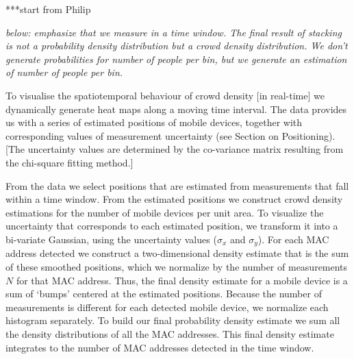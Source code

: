 \documentclass[10pt,a4paper]{article}
\begin{document}
***start from Philip

{\it below: emphasize that we measure in a time window. The final result of stacking is not a probability density distribution but a crowd density distribution. We don't generate probabilities for number of people per bin, but we generate an estimation of number of people per bin. }

To visualise the spatiotemporal behaviour of crowd density [in real-time] we dynamically generate heat maps along a moving time interval. 
The data provides us with a series of estimated positions of mobile devices, together with corresponding values of measurement uncertainty (see Section on Positioning).
[The uncertainty values are determined by the co-variance matrix resulting from the chi-square fitting method.]

From the data we select positions that are estimated from measurements that fall within a time window.
From the estimated positions we construct crowd density estimations for the number of mobile devices per unit area.
To visualize the uncertainty that corresponds to each estimated position, we transform it into a bi-variate Gaussian, using the uncertainty values ($\sigma_{x}$ and $\sigma_{y}$).
For each MAC address detected we construct a two-dimensional density estimate that is the sum of these smoothed positions, which we normalize by the number of measurements $N$ for that MAC address.
Thus, the final density estimate for a mobile device is a sum of `bumps' centered at the estimated positions.
Because the number of measurements is different for each detected mobile device, we normalize each histogram separately.
To build our final probability density estimate we sum all the density distributions of all the MAC addresses.
This final density estimate integrates to the number of MAC addresses detected in the time window.
\end{document}

